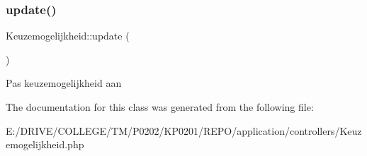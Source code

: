 \subsubsection{\texorpdfstring{update()}{update()}}
{\footnotesize\ttfamily Keuzemogelijkheid\+::update (\begin{DoxyParamCaption}{ }\end{DoxyParamCaption})}

Pas keuzemogelijkheid aan 

The documentation for this class was generated from the following file\+:\begin{DoxyCompactItemize}
\item 
E\+:/\+D\+R\+I\+V\+E/\+C\+O\+L\+L\+E\+G\+E/\+T\+M/\+P0202/\+K\+P0201/\+R\+E\+P\+O/application/controllers/Keuzemogelijkheid.\+php\end{DoxyCompactItemize}
